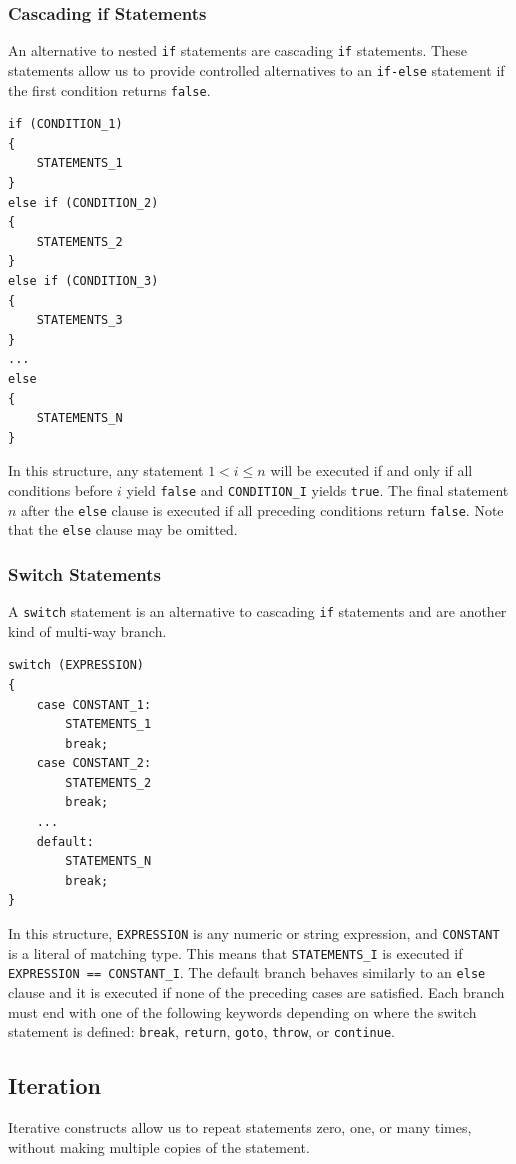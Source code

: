 \documentclass{article}
\begin{document}
\subsubsection{Cascading if Statements}
An alternative to nested \texttt{if} statements are
cascading \texttt{if} statements. These statements allow us
to provide controlled alternatives to an \texttt{if-else}
statement if the first condition returns \texttt{false}.
\begin{verbatim}
if (CONDITION_1)
{
    STATEMENTS_1
}
else if (CONDITION_2)
{
    STATEMENTS_2
}
else if (CONDITION_3)
{
    STATEMENTS_3
}
...
else
{
    STATEMENTS_N
}
\end{verbatim}
In this structure, any statement \(1 < i \leq n\) will be executed if
and only if all conditions before \(i\) yield
\texttt{false} and \texttt{CONDITION_I} yields
\texttt{true}. The final statement \(n\) after the
\texttt{else} clause is executed if all preceding
conditions return \texttt{false}. Note that the
\texttt{else} clause may be omitted.
\subsubsection{Switch Statements}
A \texttt{switch} statement is an alternative to cascading
\texttt{if} statements and are another kind of multi-way
branch.
\begin{verbatim}
switch (EXPRESSION)
{
    case CONSTANT_1:
        STATEMENTS_1
        break;
    case CONSTANT_2:
        STATEMENTS_2
        break;
    ...
    default:
        STATEMENTS_N
        break;
}
\end{verbatim}
In this structure, \texttt{EXPRESSION} is any numeric or
string expression, and \texttt{CONSTANT} is a literal of
matching type. This means that \texttt{STATEMENTS_I} is
executed if \texttt{EXPRESSION == CONSTANT_I}. The default
branch behaves similarly to an \texttt{else} clause and it
is executed if none of the preceding cases are satisfied. Each branch
must end with one of the following keywords depending on where the
switch statement is defined: \texttt{break},
\texttt{return}, \texttt{goto},
\texttt{throw}, or \texttt{continue}.
\subsection{Iteration}
Iterative constructs allow us to repeat statements zero, one, or many
times, without making multiple copies of the statement.
\end{document}
